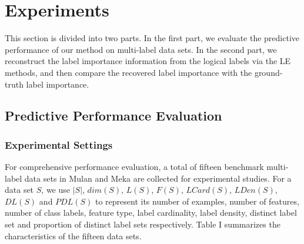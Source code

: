 \documentclass[conference]{IEEEtran}
\begin{document}
\section{Experiments}
This section is divided into two parts. In the first part, we evaluate the predictive performance of our method on multi-label data sets. In the second part, we reconstruct the label importance information from the logical labels via the LE methods, and then compare the recovered label importance with the ground-truth label importance.

\subsection{Predictive Performance Evaluation}
\subsubsection{Experimental Settings}
For comprehensive performance evaluation, a total of fifteen benchmark multi-label data sets in Mulan \cite{tsoumakas2011mulan} and Meka \cite{MEKA} are collected for experimental studies. For a data set $S$, we use $|S|$, $dim(S)$, $L(S)$, $F(S)$, $LCard(S)$, $LDen(S)$, $DL(S)$ and $PDL(S)$ to represent its number of examples, number of features, number of class labels, feature type, label cardinality, label density, distinct label set and proportion of distinct label sets respectively. Table I summarizes the characteristics of the fifteen data sets.
\end{document}
